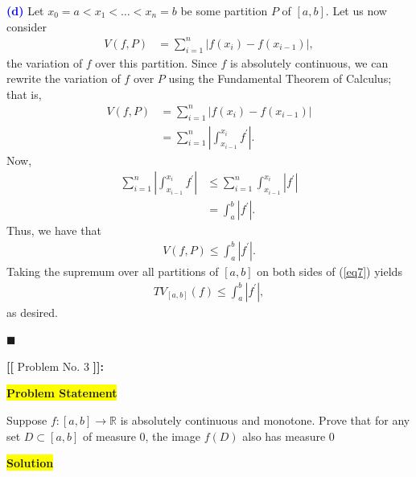 \documentclass[12pt]{article}
\newcommand{\mybox}{%
    \collectbox{%
        \setlength{\fboxsep}{2pt}%
        \fbox{\BOXCONTENT}%
    }%
}
\begin{document}
\noindent\textcolor{blue}{\textbf{(d)}} Let $x_0 = a < x_1 < \ldots < x_n = b$ be some partition $P$ of $[a,b]$. Let us now consider
\begin{align}
V(f, P)&= \sum\limits_{i=1}^{n}\left|f(x_i) - f(x_{i-1})\right|, \label{eq6}
\end{align}
the variation of $f$ over this partition. Since $f$ is absolutely continuous, we can rewrite the variation of $f$ over $P$ using the Fundamental Theorem of Calculus; that is,
\begin{align}
    V(f, P)&= \sum\limits_{i=1}^{n}\left|f(x_i) - f(x_{i-1})\right| \\
    &=\sum\limits_{i=1}^{n}\left|\int_{x_{i-1}}^{x_i} f^{\prime} \right|.
\end{align}
Now,
\begin{align}
    \sum\limits_{i=1}^{n}\left|\int_{x_{i-1}}^{x_i} f^{\prime} \right| &\leq \sum\limits_{i=1}^{n}\int_{x_{i-1}}^{x_i} \left| f^{\prime} \right| \\
    &= \int_{a}^{b} \left|f^{\prime}\right|.
\end{align}
Thus, we have that 
\begin{align}
    V(f,P) \leq \int_a^b \left|f^{\prime}\right|. \label{eq7}
\end{align}
Taking the supremum over all partitions of $[a,b]$ on both sides of (\ref{eq7}) yields
\begin{align}
    TV_{[a,b]}(f) \leq \int_a^b \left| f^{\prime} \right|,
\end{align}
as desired.


\hfill$\blacksquare$

\pagebreak

\noindent \textbf{{\huge [}{\Large [}} Problem No. 3 \textbf{{\Large ]}{\huge ]}}{\Large \textbf{:}}

\vspace{3mm}

\noindent\mybox{\colorbox{yellow}{\textbf{Problem Statement}}}\hspace{3mm}\hrulefill 

\noindent Suppose $f:[a,b]\rightarrow\mathbb{R}$ is absolutely continuous and monotone. Prove that for any set $D\subset[a,b]$ of measure $0$, the image $f(D)$ also has measure $0$

\vspace{5mm}

\noindent\mybox{\colorbox{yellow}{\textbf{Solution}}}\hspace{3mm}\hrulefill
\end{document}
